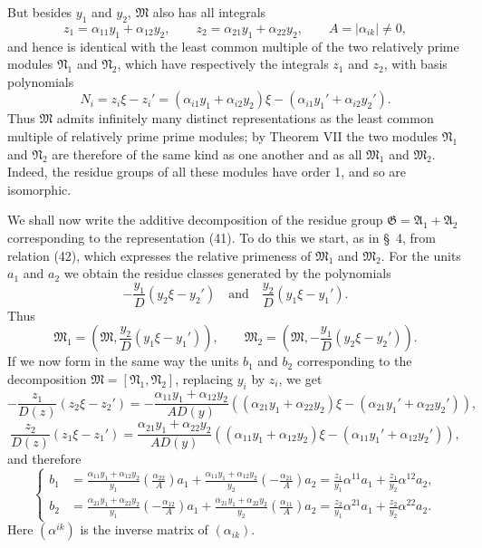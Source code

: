 \documentclass[11pt]{article}
\begin{document}
But besides $y_1$ and $y_2$, $\mathfrak M$ also has all integrals
\[
 z_1=\alpha_{11}y_1+\alpha_{12}y_2,
 \qquad
 z_2=\alpha_{21}y_1+\alpha_{22}y_2,
 \qquad
 A=|\alpha_{ik}|\ne0,
\]
and hence is identical with the least common multiple of the two relatively prime modules $\mathfrak N_1$ and $\mathfrak N_2$, which have respectively the integrals $z_1$ and $z_2$, with basis polynomials
\[
 N_i=z_i\xi-z_i'=(\alpha_{i1}y_1+\alpha_{i2}y_2)\xi-(\alpha_{i1}y_1'+\alpha_{i2}y_2').
\]
Thus $\mathfrak M$ admits infinitely many distinct representations as the least common multiple of relatively prime prime modules; by Theorem VII the two modules $\mathfrak N_1$ and $\mathfrak N_2$ are therefore of the same kind as one another and as all $\mathfrak M_1$ and $\mathfrak M_2$. Indeed, the residue groups of all these modules have order 1, and so are isomorphic.

We shall now write the additive decomposition of the residue group $\mathfrak G=\mathfrak A_1+\mathfrak A_2$ corresponding to the representation (41). To do this we start, as in \S~4, from relation (42), which expresses the relative primeness of $\mathfrak M_1$ and $\mathfrak M_2$. For the units $a_1$ and $a_2$ we obtain the residue classes generated by the polynomials
\[
 -\frac{y_1}{D}(y_2\xi-y_2')
 \quad\text{and}\quad
 \frac{y_2}{D}(y_1\xi-y_1').
\]
Thus
\[
 \mathfrak M_1=\left(\mathfrak M,\frac{y_2}{D}(y_1\xi-y_1')\right),
 \qquad
 \mathfrak M_2=\left(\mathfrak M,-\frac{y_1}{D}(y_2\xi-y_2')\right).
\]
If we now form in the same way the units $b_1$ and $b_2$ corresponding to the decomposition $\mathfrak M=[\mathfrak N_1,
\mathfrak N_2]$, replacing $y_i$ by $z_i$, we get
\[
 -\frac{z_1}{D(z)}(z_2\xi-z_2')
 =-\frac{\alpha_{11}y_1+\alpha_{12}y_2}{AD(y)}
 ((\alpha_{21}y_1+\alpha_{22}y_2)\xi-(\alpha_{21}y_1'+\alpha_{22}y_2')),
\]
\[
 \frac{z_2}{D(z)}(z_1\xi-z_1')
 =\frac{\alpha_{21}y_1+\alpha_{22}y_2}{AD(y)}
 ((\alpha_{11}y_1+\alpha_{12}y_2)\xi-(\alpha_{11}y_1'+\alpha_{12}y_2')),
\]
and therefore
\begin{equation}
\left\{
\begin{aligned}
 b_1&=\frac{\alpha_{11}y_1+\alpha_{12}y_2}{y_1}
 \left(\frac{\alpha_{22}}{A}\right)a_1
 +\frac{\alpha_{11}y_1+\alpha_{12}y_2}{y_2}
 \left(-\frac{\alpha_{21}}{A}\right)a_2
 =\frac{z_1}{y_1}\alpha^{11}a_1+\frac{z_1}{y_2}\alpha^{12}a_2,\\
 b_2&=\frac{\alpha_{21}y_1+\alpha_{22}y_2}{y_1}
 \left(-\frac{\alpha_{12}}{A}\right)a_1
 +\frac{\alpha_{21}y_1+\alpha_{22}y_2}{y_2}
 \left(\frac{\alpha_{11}}{A}\right)a_2
 =\frac{z_2}{y_1}\alpha^{21}a_1+\frac{z_2}{y_2}\alpha^{22}a_2.
\end{aligned}\right.
\tag{43}
\end{equation}
Here $(\alpha^{ik})$ is the inverse matrix of $(\alpha_{ik})$.
\end{document}
